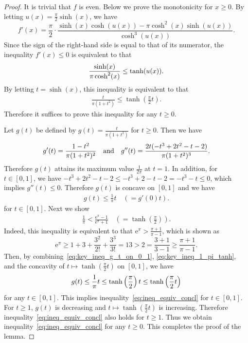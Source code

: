 \documentclass[10pt,a4paper]{amsart}
\begin{document}
\begin{proof}
It is trivial that $f$ is even. 
Below we prove the monotonicity for $x \geq 0$. 
By letting $u(x) = \frac{\pi}{2} \sinh(x)$, we have
\[
f'(x) = 
\frac{\pi}{2} \cdot
\frac{\sinh(x) \cosh(u(x)) - \pi \cosh^{2}(x) \sinh(u(x))}{\cosh^{3}(u(x))}.
\]
Since the sign of the right-hand side is equal to that of its numerator, 
the inequality $f'(x) \leq 0$ is equivalent to that 
\begin{align}
\frac{\sinh(x)}{\pi \cosh^{2}(x)} \leq \tanh(u(x)). 
\notag
\end{align}
By letting $t = \sinh(x)$,
this inequality is equivalent to that
\begin{align}
\frac{t}{\pi (1+t^{2})} \leq \tanh \left( \frac{\pi}{2} t \right). 
\label{eq:ineq_equiv_concl}
\end{align}
Therefore it suffices to prove this inequality for any $t \geq 0$.

Let $g(t)$ be defined by $g(t) = \frac{t}{\pi (1+t^{2})}$ for $t \geq 0$. 
Then we have
\begin{align}
g'(t) = \frac{1-t^{2}}{\pi(1+t^{2})^{2}}
\quad \text{and} \quad
g''(t) = \frac{2t(-t^{3} + 2t^{2} - t -2)}{\pi(1+t^{2})^{3}}.
\notag
\end{align}
Therefore $g(t)$ attains its maximum value $\frac{1}{2\pi}$ at $t = 1$. 
In addition, 
for $t \in [0, 1]$, 
we have $-t^{3} + 2t^{2} - t -2 \leq -t^{3} + 2 - t - 2 = -t^{3} - t \leq 0$, 
which implies $g''(t) \leq 0$. 
Therefore $g(t)$ is concave on $[0,1]$ and we have
\begin{align}
g(t) \leq \frac{1}{\pi} t \quad (=g'(0)t).
\label{eq:key_ineq_g_t_on_0_1}
\end{align}
for $t \in [0,1]$. 
Next we show 
\begin{align}
\frac{1}{\pi} < \frac{\mathrm{e}^{\pi} - 1}{\mathrm{e}^{\pi} + 1}
\quad 
\left( = \tanh \left( \frac{\pi}{2} \right) \right).
\label{eq:key_ineq_1_pi_tanh}
\end{align}
Indeed, this inequality is equivalent to that 
\(
\mathrm{e}^{\pi} > \frac{\pi + 1}{\pi-1}
\), which is shown as
\[
\mathrm{e}^{\pi}
\geq 1 + 3 + \frac{3^2}{2!} + \frac{3^3}{3!}
= 13 > 2 = 
\frac{3+1}{3-1}
\geq 
\frac{\pi + 1}{\pi-1}. 
\]
Then, 
by combining~\eqref{eq:key_ineq_g_t_on_0_1}, \eqref{eq:key_ineq_1_pi_tanh}, 
and the concavity of $t \mapsto \tanh(\frac{\pi}{2}t)$ on $[0,1]$, 
we have
\begin{align}
g(t) \leq \frac{1}{\pi} t \leq \tanh \left( \frac{\pi}{2} \right) t \leq \tanh \left( \frac{\pi}{2} t \right)
\notag
\end{align}
for any $t \in [0,1]$. 
This implies inequality~\eqref{eq:ineq_equiv_concl} for $t \in [0,1]$.
For $t \geq 1$, $g(t)$ is decreasing and $t \mapsto \tanh(\frac{\pi}{2}t)$ is increasing. 
Therefore inequality~\eqref{eq:ineq_equiv_concl} also holds for  $t \geq 1$. 
Thus we obtain inequality~\eqref{eq:ineq_equiv_concl} for  any $t \geq 0$.
This completes the proof of the lemma.
\end{proof}
\end{document}
